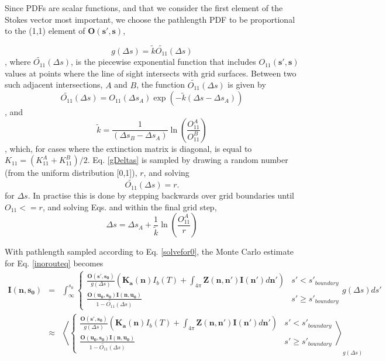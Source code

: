 Since PDFs are scalar functions, and that we consider the first element of the
Stokes vector most important, we choose the pathlength PDF to be proportional to the
(1,1) element of $\mathbf{O(s',s)}$,

\begin{equation}
g(\Delta s)=\tilde{k}\tilde{O_{11}}(\Delta s)
\label{gDeltas}
\end{equation}
, where $\tilde{O_{11}}(\Delta s)$, is the piecewise exponential
function that includes $O_{11}(\mathbf{s',s})$ values at points
where the line of sight intersects with grid surfaces.
Between two such adjacent intersections, $A$ and $B$, the function
$\tilde{O_{11}}(\Delta s)$ is given by
\begin{equation}
\tilde{O_{11}}(\Delta s)=O_{11}(\Delta s_A)\exp\left(-\tilde{k}\left(\Delta s-\Delta
s_A\right)\right)
\label{O11}
\end{equation}
, and
\begin{equation}
\tilde{k}=\frac{1}{\left(\Delta s_B-\Delta s_A\right)}
\ln\left(\frac{O_{11}^A}{O_{11}^B}\right)
\end{equation}
, which, for cases where the extinction matrix is diagonal, is equal to $K_{11}=(K_{11}^A+K_{11}^B)/2$.
Eq. \ref{gDeltas} is sampled by drawing a random number (from the uniform distribution [0,1]), $r$, and solving 
\begin{equation}
\tilde{O_{11}}(\Delta s)=r.
\label{solvefor0}
\end{equation}
for $\Delta s$.  In practise this is done by stepping backwards over grid boundaries until $O_{11}<=r$, and solving Eqs. \label{O11} and \label{solvefor0} within the final grid step,
\begin{equation}
\Delta s=\Delta s_A+\frac{1}{\tilde{k}}\ln\left(\frac{O_{11}^A}{r}\right)
\end{equation}

With pathlength sampled according to Eq. \ref{solvefor0}, the Monte
Carlo estimate for Eq. \ref{inorouteq} becomes
\begin{eqnarray}
\mathbf{I(n,s_0)}&=&\int^{s_0}_\infty\left\{\begin{array}{rl}
\frac{\mathbf{O(s',s_0)}}{g(\Delta s)}\left(\mathbf{K_a(n)}I_b(T)
+\int_{4\pi}\mathbf{Z(n,n')}\mathbf{I(n')}d\mathbf{n'}\right) & s'< s'_{boundary} \\
\frac{\mathbf{O(u_0,s_0)I(n,u_0)}}{1-\tilde{O_{11}}(\Delta s)} & s'\ge s'_{boundary}
\end{array}g(\Delta s)ds'\right.\nonumber\\
&\approx&\left\langle\left\{\begin{array}{rl}
\frac{\mathbf{O(s',s_0)}}{g(\Delta s)}\left(\mathbf{K_a(n)}I_b(T)
+\int_{4\pi}\mathbf{Z(n,n')}\mathbf{I(n')}d\mathbf{n'}\right) & s'< s'_{boundary} \\
\frac{\mathbf{O(u_0,s_0)I(n,u_0)}}{1-\tilde{O_{11}}(\Delta s)} & s'\ge s'_{boundary}
\end{array}\right.\right\rangle_{g(\Delta s)}
\label{pathlengthint}
\end{eqnarray} 

